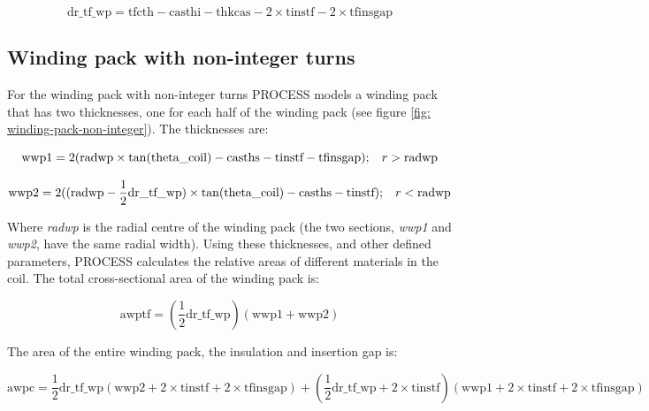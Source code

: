 \documentclass[hidelinks]{article}
\numberwithin{equation}{section}
\begin{document}
    \begin{equation}\label{eq:dr_tf_wp}
    \text{dr\_tf\_wp} = \text{tfcth} - \text{casthi} - \text{thkcas} - 2\times \text{tinstf} 
    - 2\times \text{tfinsgap}
    \end{equation}

    \subsection{Winding pack with non-integer turns}

    \noi For the winding pack with non-integer turns PROCESS models a winding pack 
    that has two thicknesses, one for each half of the winding pack (see figure 
    \ref{fig: winding-pack-non-integer}). The thicknesses are:

    \begin{equation}\label{eq: wwp1}
    \text{wwp1} = 2(\text{radwp}\times \tan(\text{theta\_coil}) - \text{casths} - \text{tinstf} 
    - \text{tfinsgap}); \hspace{0.3cm} r > \text{radwp}
    \end{equation}

    \begin{equation}\label{eq: wwp2}
    \text{wwp2} = 2((\text{radwp}-\frac{1}{2}\text{dr\_tf\_wp})\times \tan(\text{theta\_coil}) - 
    \text{casths} - \text{tinstf}); \hspace{0.3cm} r < \text{radwp} 
    \end{equation}

    \noi Where \emph{radwp} is the radial centre of the winding pack (the two sections, 
    \emph{wwp1} and \emph{wwp2}, have the same radial width). Using these thicknesses, and 
    other defined parameters, PROCESS calculates the relative areas of different materials in 
    the coil. The total cross-sectional area of the winding pack is:

    \begin{equation}\label{eq: awptf}
    \text{awptf} = (\frac{1}{2}\text{dr\_tf\_wp})(\text{wwp1}+\text{wwp2}) 
    \end{equation}

    \noi The area of the entire winding pack, the insulation and insertion gap is:

    \begin{equation}\label{eq: awpc}
    \text{awpc} = \frac{1}{2}\text{dr\_tf\_wp}(\text{wwp2} + 2\times \text{tinstf} 
    + 2\times \text{tfinsgap}) + (\frac{1}{2}\text{dr\_tf\_wp} + 2\times \text{tinstf})(\text{wwp1} 
    + 2 \times \text{tinstf} + 2\times \text{tfinsgap})
    \end{equation}
\end{document}
